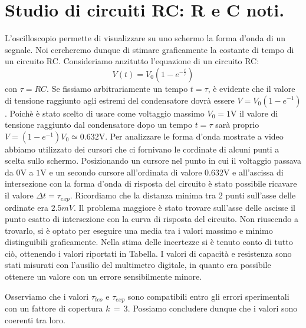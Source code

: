 \section{Studio di circuiti RC: R e C noti.}
L'oscilloscopio permette di visualizzare su uno schermo la forma d'onda di un segnale. Noi cercheremo dunque di stimare graficamente la costante di tempo di un circuito RC. Consideriamo anzitutto l'equazione di un circuito RC:
\begin{equation}
V(t)=V_0(1-e^{-\frac{t}{\tau}})
\label{RC}
\end{equation}
con $\tau=RC$. Se fissiamo arbitrariamente un tempo $t=\tau$, è evidente che il valore di tensione raggiunto agli estremi del condensatore dovrà essere $V=V_0(1-e^{-1})$. Poichè è stato scelto di usare come voltaggio massimo $V_0 = 1\si{\volt}$ il valore di tensione raggiunto dal condensatore dopo un tempo $t=\tau$ sarà proprio $V=(1-e^{-1})V_0 \simeq 0.632\si{\volt}$. 
Per analizzare le forma d'onda mostrate a video abbiamo utilizzato dei cursori che ci fornivano le cordinate di alcuni punti a scelta sullo schermo. Posizionando un cursore nel punto in cui il voltaggio passava da $0\si{\volt}$ a $1\si{\volt}$ e un secondo cursore all'ordinata di valore $0.632\si{\volt}$ e all'ascissa di intersezione con la forma d'onda di risposta del circuito è stato possibile ricavare il valore $\Delta t = \tau_{exp}$.
Ricordiamo che la distanza minima tra 2 punti sull'asse delle ordinate era $2.5mV$. Il problema maggiore è stato trovare sull'asse delle ascisse il punto esatto di intersezione con la curva di risposta del circuito. Non riuscendo a trovarlo, si è optato per eseguire una media tra i valori massimo e minimo distinguibili graficamente. Nella stima delle incertezze si è tenuto conto di tutto ciò, ottenendo i valori riportati in Tabella. I valori di capacità e resistenza sono stati misurati con l'ausilio del multimetro digitale, in quanto era possibile ottenere un valore con un errore sensibilmente minore.


Osserviamo che i valori $\tau_{teo}$ e $\tau_{exp}$ sono compatibili entro gli errori sperimentali con un fattore di copertura $k\,=\,3$. Possiamo concludere dunque che i valori sono coerenti tra loro.